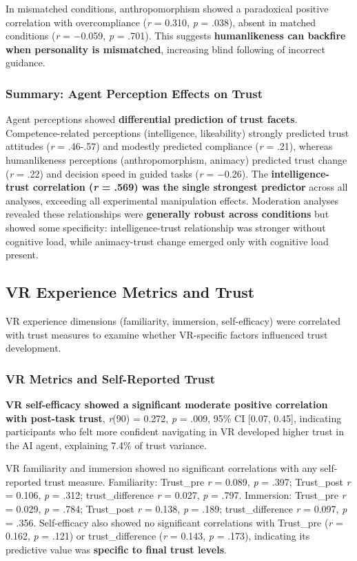 \documentclass[12pt]{article}
\begin{document}
In mismatched conditions, anthropomorphism showed a paradoxical positive correlation with overcompliance (\textit{r} = 0.310, \textit{p} = .038), absent in matched conditions (\textit{r} = $-$0.059, \textit{p} = .701). This suggests \textbf{humanlikeness can backfire when personality is mismatched}, increasing blind following of incorrect guidance.

\subsubsection{Summary: Agent Perception Effects on Trust}

Agent perceptions showed \textbf{differential prediction of trust facets}. Competence-related perceptions (intelligence, likeability) strongly predicted trust attitudes (\textit{r} = .46-.57) and modestly predicted compliance (\textit{r} = .21), whereas humanlikeness perceptions (anthropomorphism, animacy) predicted trust change (\textit{r} = .22) and decision speed in guided tasks (\textit{r} = $-$0.26). The \textbf{intelligence-trust correlation (\textit{r} = .569) was the single strongest predictor} across all analyses, exceeding all experimental manipulation effects. Moderation analyses revealed these relationships were \textbf{generally robust across conditions} but showed some specificity: intelligence-trust relationship was stronger without cognitive load, while animacy-trust change emerged only with cognitive load present.

\subsection{VR Experience Metrics and Trust}

VR experience dimensions (familiarity, immersion, self-efficacy) were correlated with trust measures to examine whether VR-specific factors influenced trust development.

\subsubsection{VR Metrics and Self-Reported Trust}

\textbf{VR self-efficacy showed a significant moderate positive correlation with post-task trust}, \textit{r}(90) = 0.272, \textit{p} = .009, 95\% CI [0.07, 0.45], indicating participants who felt more confident navigating in VR developed higher trust in the AI agent, explaining 7.4\% of trust variance.

VR familiarity and immersion showed no significant correlations with any self-reported trust measure. Familiarity: Trust\_pre \textit{r} = 0.089, \textit{p} = .397; Trust\_post \textit{r} = 0.106, \textit{p} = .312; trust\_difference \textit{r} = 0.027, \textit{p} = .797. Immersion: Trust\_pre \textit{r} = 0.029, \textit{p} = .784; Trust\_post \textit{r} = 0.138, \textit{p} = .189; trust\_difference \textit{r} = 0.097, \textit{p} = .356. Self-efficacy also showed no significant correlations with Trust\_pre (\textit{r} = 0.162, \textit{p} = .121) or trust\_difference (\textit{r} = 0.143, \textit{p} = .173), indicating its predictive value was \textbf{specific to final trust levels}.
\end{document}
